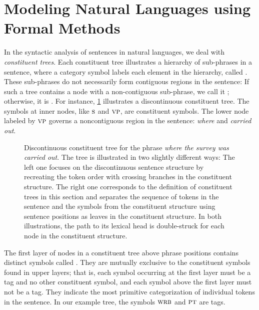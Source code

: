 \documentclass[../document.tex]{subfiles}
\begin{document}
    \section{Modeling Natural Languages using Formal Methods}\label{sec:preliminaries:ctrees}
    In the syntactic analysis of sentences in natural languages, we deal with \emph{constituent trees}.
    Each constituent tree illustrates a hierarchy of sub-phrases in a sentence, where a category symbol labels each element in the hierarchy, called .
    These sub-phrases do not necessarily form contiguous regions in the sentence:
    If such a tree contains a node with a non-contiguous sub-phrase, we call it ; otherwise, it is .
    For instance, \cref{fig:pre:ctree} illustrates a discontinuous constituent tree.
    The symbols at inner nodes, like \(\textsc{s}\) and \(\textsc{vp}\), are constituent symbols.
    The lower node labeled by \(\textsc{vp}\) governs a noncontiguous region in the sentence: \emph{where} and \emph{carried out}.

    \begin{figure}
        \null\hfill
        
        \hfill\null

        \caption{\label{fig:pre:ctree}
            Discontinuous constituent tree for the phrase \emph{where the survey was carried out}.
            The tree is illustrated in two slightly different ways:
                The left one focuses on the discontinuous sentence structure by recreating the token order with crossing branches in the constituent structure.
                The right one corresponds to the definition of constituent trees in this section and separates the sequence of tokens in the sentence and the  symbols from the constituent structure using sentence positions as leaves in the constituent structure.
            In both illustrations, the path to its lexical head is double-struck for each node in the constituent structure.
        }
    \end{figure}

    The first layer of nodes in a constituent tree above phrase positions contains distinct symbols called  .
    They are mutually exclusive to the constituent symbols found in upper layers; that is, each symbol occurring at the first layer must be a  tag and no other constituent symbol, and each symbol above the first layer must not be a  tag.
    They indicate the most primitive categorization of individual tokens in the sentence.
    In our example tree, the symbols \(\textsc{wrb}\) and \(\textsc{pt}\) are  tags.
\end{document}
